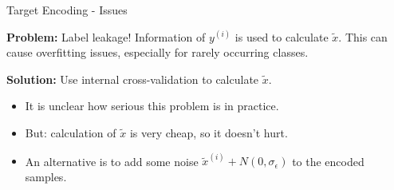 \documentclass[11pt,compress,t,notes=noshow, xcolor=table]{beamer}
\begin{document}

\begin{vbframe}{Target Encoding - Issues}

\textbf{Problem:} Label leakage! Information of $y^{(i)}$ is used to calculate $\tilde x$. This can cause overfitting issues, especially for rarely occurring classes.

\textbf{Solution:} Use internal cross-validation to calculate $\tilde x$.

\begin{itemize}
    \item It is unclear how serious this problem is in practice.
    \item But: calculation of $\tilde x$ is very cheap, so it doesn't hurt.
    \item An alternative is to add some noise $\tilde x^{(i)} + N(0,\sigma_\epsilon)$ to the encoded samples.
\end{itemize}

\end{vbframe}

\endlecture
\end{document}
